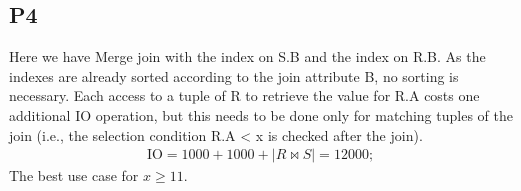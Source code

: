 \documentclass[10pt]{article}
\begin{document}
  \subsection*{P4}
  Here we have Merge join with the index on S.B and the index on R.B. As the indexes
  are already sorted according to the join attribute B, no sorting is necessary.
  Each access to a tuple of R to retrieve the value for R.A costs one additional
  IO operation, but this needs to be done only for matching tuples of the join
  (i.e., the selection condition R.A < x is checked after the join).\\
  \begin{align*}
    \text{IO} = 1000 + 1000 + |R \bowtie S| = 12000;
  \end{align*}
  The best use case for $x \geq 11$.
\end{document}
